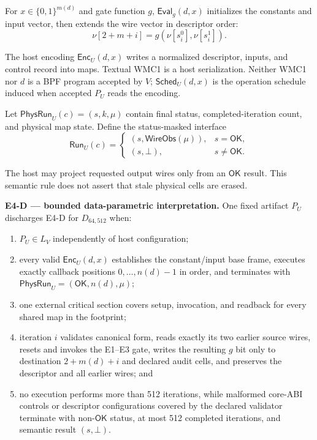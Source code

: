 \documentclass[conference]{IEEEtran}
\begin{document}
For $x\in\{0,1\}^{m(d)}$ and gate function $g$, $\mathsf{Eval}_g(d,x)$ initializes the constants and input vector, then extends the wire vector in descriptor order:
\begin{equation}
\nu[2+m+i]=g(\nu[s_i^0],\nu[s_i^1]).
\end{equation}

The host encoding $\mathsf{Enc}_U(d,x)$ writes a normalized descriptor, inputs, and control record into maps. Textual WMC1 is a host serialization. Neither WMC1 nor $d$ is a BPF program accepted by $V$; $\mathsf{Sched}_U(d,x)$ is the operation schedule induced when accepted $P_U$ reads the encoding.

Let $\mathsf{PhysRun}_U(c)=(s,k,\mu)$ contain final status, completed-iteration count, and physical map state. Define the status-masked interface
\begin{equation}
\mathsf{Run}_U(c)=
\begin{cases}
(s,\mathsf{WireObs}(\mu)),&s=\mathsf{OK},\\
(s,\bot),&s\ne\mathsf{OK}.
\end{cases}
\end{equation}

The host may project requested output wires only from an $\mathsf{OK}$ result. This semantic rule does not assert that stale physical cells are erased.

\medskip
\noindent\textbf{E4-D --- bounded data-parametric interpretation.}
One fixed artifact $P_U$ discharges E4-D for $D_{64,512}$ when:

\begin{enumerate}
\item $P_U\in L_V$ independently of host configuration;
\item every valid $\mathsf{Enc}_U(d,x)$ establishes the constant/input base frame, executes exactly callback positions $0,\ldots,n(d)-1$ in order, and terminates with $\mathsf{PhysRun}_U=(\mathsf{OK},n(d),\mu)$;
\item one external critical section covers setup, invocation, and readback for every shared map in the footprint;
\item iteration $i$ validates canonical form, reads exactly its two earlier source wires, resets and invokes the E1--E3 gate, writes the resulting $g$ bit only to destination $2+m(d)+i$ and declared audit cells, and preserves the descriptor and all earlier wires; and
\item no execution performs more than 512 iterations, while malformed core-ABI controls or descriptor configurations covered by the declared validator terminate with non-$\mathsf{OK}$ status, at most 512 completed iterations, and semantic result $(s,\bot)$.
\end{enumerate}
\end{document}
